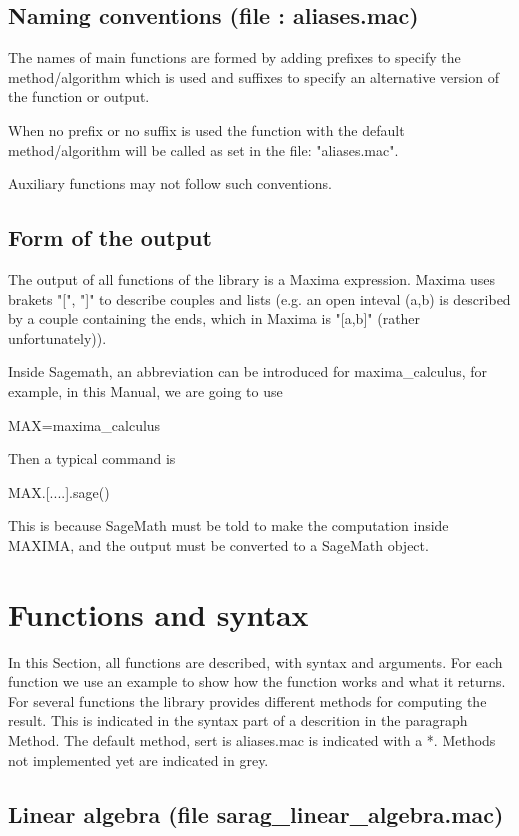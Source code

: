 \documentclass{article}
\begin{document}
\subsection{Naming conventions (file : aliases.mac)}


The names of main functions are formed by adding prefixes to specify the
method/algorithm which is used and suffixes to specify an alternative version
of the function or output.

When no prefix or no suffix is used the function with the default
method/algorithm will be called as set in the file: "aliases.mac".

Auxiliary functions may not follow such conventions.

\subsection{Form of the output}

The output of all functions of the library is a Maxima expression. Maxima uses
brakets "[", "]" to describe couples and lists (e.g. an open inteval (a,b) is
described by a couple containing the ends, which in Maxima is "[a,b]" (rather
unfortunately)).

Inside Sagemath, an abbreviation can be introduced for maxima\_calculus, for example, in this Manual, we are going to use

MAX=maxima\_calculus

Then a typical command is

MAX.[....].sage()

This is because SageMath must be told to make the computation inside MAXIMA, and the output must be converted to a SageMath object.

\section{Functions and syntax}

In this Section, all functions are described, with  syntax and arguments. For
each function we use an example to show how the function works and what it
returns.
For several functions the library provides different methods for computing
the result. This is indicated in the syntax part of a descrition in the
paragraph Method. The default method, sert is aliases.mac is indicated with a
*. 
Methods not implemented yet are indicated in {\color{grey}
 grey}.

\subsection{Linear algebra (file  sarag\_linear\_algebra.mac)}
\end{document}
